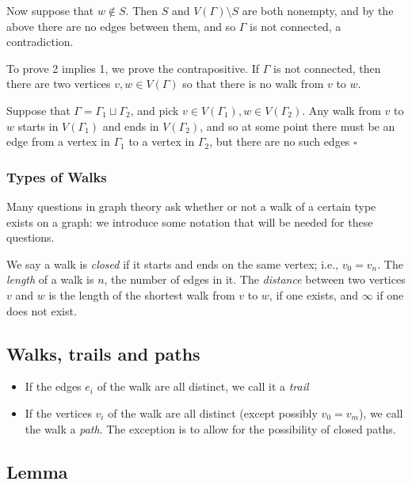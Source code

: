 \documentclass[]{article}
\providecommand{\tightlist}{%
  \setlength{\itemsep}{0pt}\setlength{\parskip}{0pt}}
\begin{document}
Now suppose that \(w\notin S\). Then \(S\) and \(V(\Gamma)\setminus S\)
are both nonempty, and by the above there are no edges between them, and
so \(\Gamma\) is not connected, a contradiction.

To prove 2 implies 1, we prove the contrapositive. If \(\Gamma\) is not
connected, then there are two vertices \(v,w\in V(\Gamma)\) so that
there is no walk from \(v\) to \(w\).

Suppose that \(\Gamma=\Gamma_1\sqcup\Gamma_2\), and pick
\(v\in V(\Gamma_1), w\in V(\Gamma_2)\). Any walk from \(v\) to \(w\)
starts in \(V(\Gamma_1)\) and ends in \(V(\Gamma_2)\), and so at some
point there must be an edge from a vertex in \(\Gamma_1\) to a vertex in
\(\Gamma_2\), but there are no such edges \(\square\)

\subsubsection{Types of Walks}\label{types-of-walks}

Many questions in graph theory ask whether or not a walk of a certain
type exists on a graph: we introduce some notation that will be needed
for these questions.

We say a walk is \emph{closed} if it starts and ends on the same vertex;
i.e., \(v_0=v_n\). The \emph{length} of a walk is \(n\), the number of
edges in it. The \emph{distance} between two vertices \(v\) and \(w\) is
the length of the shortest walk from \(v\) to \(w\), if one exists, and
\(\infty\) if one does not exist.

\subsection{Walks, trails and paths}\label{walks-trails-and-paths}

\begin{itemize}
\tightlist
\item
  If the edges \(e_i\) of the walk are all distinct, we call it a
  \emph{trail}
\item
  If the vertices \(v_i\) of the walk are all distinct (except possibly
  \(v_0=v_m\)), we call the walk a \emph{path}. The exception is to
  allow for the possibility of closed paths.
\end{itemize}

\subsection{Lemma}\label{lemma-1}
\end{document}
